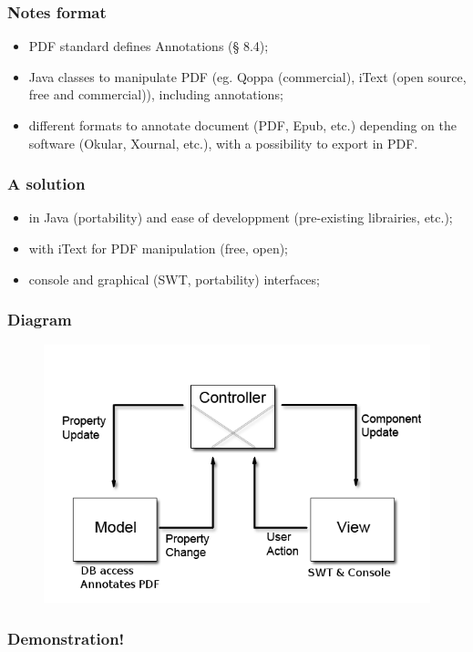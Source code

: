 \documentclass[t,12pt]{beamer}
\begin{document}
\begin{frame}
  \frametitle{Notes format}
  \begin{itemize}
    \item PDF standard defines Annotations (§ 8.4);
    \pause \item Java classes to manipulate PDF (eg. Qoppa (commercial),
      iText (open source, free and commercial)), including annotations;
    \pause \item different formats to annotate document (PDF, Epub, etc.)
      depending on the software (Okular, Xournal, etc.), with a possibility to
      export in PDF.
  \end{itemize}
\end{frame}

\begin{frame}
  \frametitle{A solution}
  \begin{itemize}
    \item in Java (portability) and ease of developpment (pre-existing
      librairies, etc.);
    \pause \item with iText for PDF manipulation (free, open);
    \pause \item console and graphical (SWT, portability) interfaces;
  \end{itemize}
\end{frame}

\begin{frame}
  \frametitle{Diagram}
  \begin{figure}[!ht]
    \vfill
    \centering
    \includegraphics[scale=.5]{diagram.png}
  \end{figure}
\end{frame}

\begin{frame}
  \frametitle{Demonstration!}
\end{frame}
\end{document}
